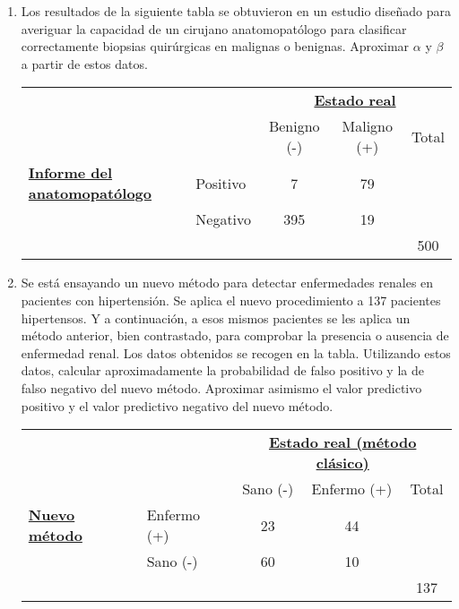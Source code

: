 \documentclass[10pt,a4paper]{article}
\newcounter {cont01}
\begin{document}
\begin{enumerate}
    \item Los resultados de la siguiente tabla se obtuvieron en un estudio diseñado para averiguar la capacidad de un cirujano anatomopatólogo para clasificar correctamente biopsias quirúrgicas en malignas o benignas. Aproximar $\alpha$ y $\beta$ a partir de estos datos.

        \begin{center}
            \begin{tabular}{llccc}
            &&\multicolumn{3}{c}{\underline{\bf Estado real}}\\

                                  &          & Benigno (-)& Maligno (+)& Total\\
            \hline
  \underline{\bf Informe del anatomopatólogo} & Positivo & 7 & 79   &   \\
                                              & Negativo & 395  & 19 &   \\
            \hline
                                              &          &     &     & 500  \\
            \hline
            \end{tabular}
        \end{center}

    \item Se está ensayando un nuevo método para detectar enfermedades renales en pacientes con hipertensión. Se aplica el nuevo procedimiento a 137 pacientes hipertensos. Y a continuación, a esos mismos pacientes se les aplica un método anterior, bien contrastado, para comprobar la presencia o ausencia de enfermedad renal. Los datos obtenidos se recogen en la tabla. Utilizando estos datos, calcular aproximadamente la probabilidad de falso positivo y la de falso negativo del nuevo método. Aproximar asimismo el valor predictivo positivo y el valor predictivo negativo del nuevo método.

        \begin{center}
            \begin{tabular}{llccc}
            &&\multicolumn{3}{c}{\underline{\bf Estado real (método clásico)}}\\

                                  &          & Sano (-)& Enfermo (+)& Total\\
            \hline
            \underline{\bf Nuevo método}     & Enfermo (+) & 23  & 44 &   \\
                                             & Sano (-) & 60  & 10 &   \\
            \hline
                                              &          &     &     & 137  \\
            \hline
            \end{tabular}
        \end{center}


\end{enumerate}
\end{document}
